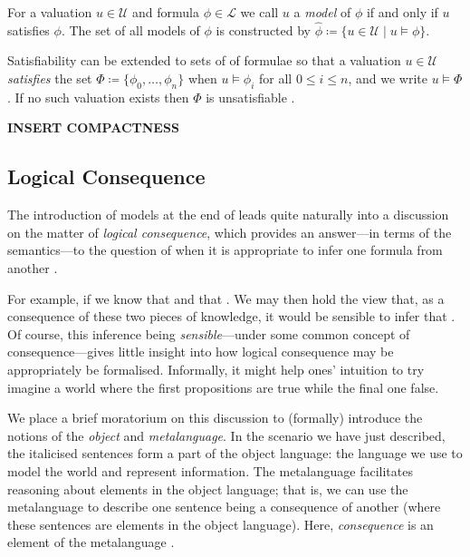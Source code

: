 \begin{definition}
  \label{definition:model}  For a valuation $u \in \mathcal{U}$ and formula $\phi \in \mathcal{L}$ we call $u$ a \textit{model}
  of $\phi$ if and only if $u$ satisfies $\phi$. The set of all models of $\phi$ is constructed by $\hat{\phi}\coloneqq \{u \in \mathcal{U}\mid
  u \vDash \phi \}$.
\end{definition}

Satisfiability can be extended to sets of of formulae so that a valuation $u \in \mathcal{U}$ \textit{satisfies} the set $\Phi \coloneqq \{\phi
_{0}, \ldots , \phi_{n}\}$ when $u \vDash \phi_{i}$ for all $0 \leq i \leq n$, and we write $u \vDash \Phi$. If no such valuation exists then
$\Phi$ is unsatisfiable \cite[p. 31]{Ben1993Mathematical}.

\begin{definition}
  \label{definition:compactness} \textbf{INSERT COMPACTNESS}
\end{definition}

\subsection{Logical Consequence}
\label{subsection:logical-consequence} 

The introduction of models at the end of  leads quite naturally into a discussion on the matter of \textit{logical
consequence}, which provides an answer---in terms of the semantics---to the question of when it is appropriate to infer one formula from another
\cite[p. 408]{tarski1936consequence}.

For example, if we know that  and that .
We may then hold the view that, as a consequence of these two pieces of knowledge, it would be sensible to infer that .
Of course, this inference being \textit{sensible}---under some common concept of consequence---gives little insight into how logical consequence
may be appropriately be formalised. Informally, it might help ones' intuition to try imagine a world where the first propositions are true
while the final one false.

  We place a brief moratorium on this discussion to (formally) introduce the notions of the
\textit{object} and \textit{metalanguage}. In the scenario we have just described, the italicised sentences form a part of the object
language: the language we use to model the world and represent information. The metalanguage facilitates reasoning about elements in the
object language; that is, we can use the metalanguage to describe one sentence being a consequence of another (where these sentences are elements
in the object language). Here, \textit{consequence} is an element of the metalanguage \cite[p 22]{Ben1993Mathematical}.

